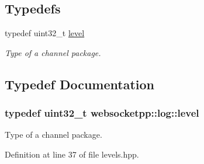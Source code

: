 \subsection*{Typedefs}
\begin{DoxyCompactItemize}
\item 
typedef uint32\+\_\+t \hyperlink{namespacewebsocketpp_1_1log_a12d4d17939f102db8c9183d400a41960}{level}
\begin{DoxyCompactList}\small\item\em Type of a channel package. \end{DoxyCompactList}\end{DoxyCompactItemize}


\subsection{Typedef Documentation}
\hypertarget{namespacewebsocketpp_1_1log_a12d4d17939f102db8c9183d400a41960}{}
\subsubsection[{level}]{\setlength{\rightskip}{0pt plus 5cm}typedef uint32\+\_\+t {\bf websocketpp\+::log\+::level}}\label{namespacewebsocketpp_1_1log_a12d4d17939f102db8c9183d400a41960}


Type of a channel package. 



Definition at line 37 of file levels.\+hpp.

